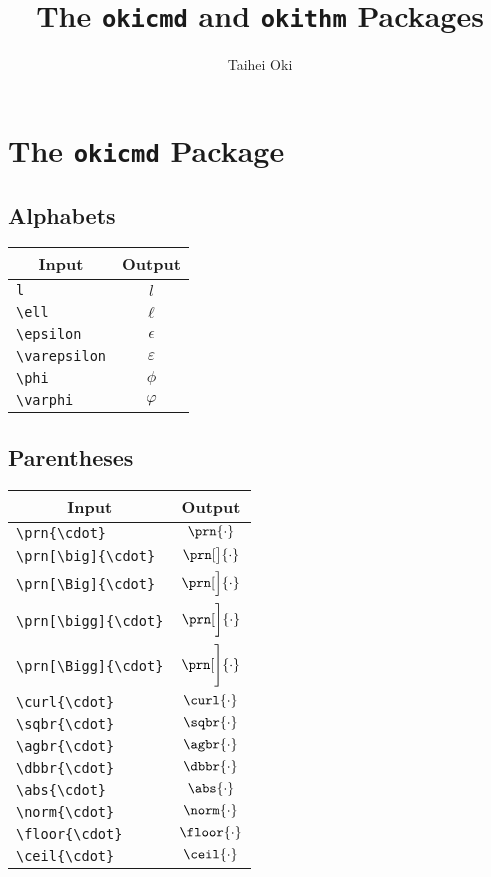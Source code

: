 \documentclass[a4paper, 11pt]{article}
\title{The \texttt{okicmd} and \texttt{okithm} Packages}
\author{Taihei Oki}
\begin{document}
\maketitle

\section{The \texttt{okicmd} Package}

\subsection{Alphabets}
\begin{center}
  \begin{tabular}{lc} \toprule
    \multicolumn{1}{c}{Input} & Output        \\\midrule
    \verb|l|    & $l$           \\
    \verb|\ell|    & $\ell$        \\
    \verb|\epsilon|    & $\epsilon$    \\
    \verb|\varepsilon|    & $\varepsilon$ \\
    \verb|\phi|    & $\phi$        \\
    \verb|\varphi|    & $\varphi$     \\
    \bottomrule
  \end{tabular}
\end{center}

\subsection{Parentheses}
\begin{center}
  \begin{tabular}{lc} \toprule
    \multicolumn{1}{c}{Input} & Output               \\\midrule
    \verb|\prn{\cdot}|    & $\prn{\cdot}$        \\
    \verb|\prn[\big]{\cdot}|    & $\prn[\big]{\cdot}$  \\
    \verb|\prn[\Big]{\cdot}|    & $\prn[\Big]{\cdot}$  \\
    \verb|\prn[\bigg]{\cdot}|   & $\prn[\bigg]{\cdot}$ \\
    \verb|\prn[\Bigg]{\cdot}|   & $\prn[\Bigg]{\cdot}$ \\
    \verb|\curl{\cdot}|   & $\curl{\cdot}$       \\
    \verb|\sqbr{\cdot}|   & $\sqbr{\cdot}$       \\
    \verb|\agbr{\cdot}|   & $\agbr{\cdot}$       \\
    \verb|\dbbr{\cdot}|   & $\dbbr{\cdot}$       \\
    \verb|\abs{\cdot}|   & $\abs{\cdot}$        \\
    \verb|\norm{\cdot}|   & $\norm{\cdot}$       \\
    \verb|\floor{\cdot}|   & $\floor{\cdot}$      \\
    \verb|\ceil{\cdot}|   & $\ceil{\cdot}$       \\
    \bottomrule
  \end{tabular}
\end{center}
\end{document}
